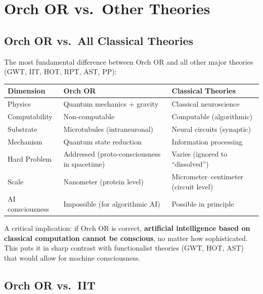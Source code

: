 \documentclass[11pt,a4paper]{report}
\begin{document}
\chapter{Orch OR vs.\ Other Theories}

\section{Orch OR vs.\ All Classical Theories}

The most fundamental difference between Orch OR and all other major theories (GWT, IIT, HOT, RPT, AST, PP):

\begin{compbox}
\renewcommand{\arraystretch}{1.4}
\begin{tabular}{>{\raggedright}p{3cm} >{\raggedright}p{5cm} >{\raggedright\arraybackslash}p{5cm}}
  \toprule
  \textbf{Dimension} & \textbf{Orch OR} & \textbf{Classical Theories} \\
  \midrule
  Physics & Quantum mechanics + gravity & Classical neuroscience \\
  Computability & Non-computable & Computable (algorithmic) \\
  Substrate & Microtubules (intraneuronal) & Neural circuits (synaptic) \\
  Mechanism & Quantum state reduction & Information processing \\
  Hard Problem & Addressed (proto-consciousness in spacetime) & Varies (ignored to ``dissolved'') \\
  Scale & Nanometer (protein level) & Micrometer--centimeter (circuit level) \\
  AI consciousness & Impossible (for algorithmic AI) & Possible in principle \\
  \bottomrule
\end{tabular}
\end{compbox}

A critical implication: if Orch OR is correct, \textbf{artificial intelligence based on classical computation cannot be conscious}, no matter how sophisticated. This puts it in sharp contrast with functionalist theories (GWT, HOT, AST) that would allow for machine consciousness.

\section{Orch OR vs.\ IIT}
\end{document}
